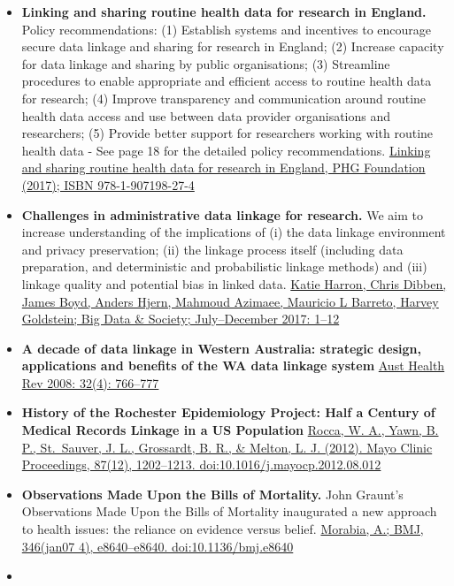 \documentclass[]{book}
\begin{document}
\begin{itemize}
\item
  \textbf{Linking and sharing routine health data for research in England.} Policy recommendations: (1) Establish systems and incentives to encourage secure data linkage and sharing for research in
  England; (2) Increase capacity for data linkage and sharing by public organisations; (3) Streamline procedures to enable appropriate and efficient access to routine health data for research; (4) Improve transparency and communication around routine health data access and use between data provider organisations and researchers; (5) Provide better support for researchers working with routine health data - See page 18 for the detailed policy recommendations. \href{https://www.phgfoundation.org/documents/PHGF-linking-and-sharing-routine-health-data-for-research-in-england.pdf}{Linking and sharing routine health data for research in England, PHG Foundation (2017); ISBN 978-1-907198-27-4}
\item
  \textbf{Challenges in administrative data linkage for research.} We aim to increase understanding of the implications of (i) the data linkage environment and privacy preservation; (ii) the linkage process itself (including data preparation, and deterministic and probabilistic linkage methods) and (iii) linkage quality and potential bias in linked data. \href{https://journals.sagepub.com/doi/pdf/10.1177/2053951717745678}{Katie Harron, Chris Dibben, James Boyd, Anders Hjern, Mahmoud Azimaee, Mauricio L Barreto, Harvey Goldstein; Big Data \& Society; July--December 2017: 1--12}
\item
  \textbf{A decade of data linkage in Western Australia: strategic design, applications and benefits of the WA data linkage system} \href{http://www.publish.csiro.au/ah/pdf/AH080766}{Aust Health Rev 2008: 32(4): 766--777}
\item
  \textbf{History of the Rochester Epidemiology Project: Half a Century of Medical Records Linkage in a US Population} \href{https://sci-hub.tw/10.1016/j.mayocp.2012.08.012}{Rocca, W. A., Yawn, B. P., St.~Sauver, J. L., Grossardt, B. R., \& Melton, L. J. (2012). Mayo Clinic Proceedings, 87(12), 1202--1213. doi:10.1016/j.mayocp.2012.08.012}
\item
  \textbf{Observations Made Upon the Bills of Mortality.} John Graunt's Observations Made Upon the Bills of Mortality inaugurated a new approach to health issues: the reliance on evidence versus belief. \href{https://sci-hub.tw/10.1136/bmj.e8640}{Morabia, A.; BMJ, 346(jan07 4), e8640--e8640. doi:10.1136/bmj.e8640}
\item

\end{itemize}
\end{document}
